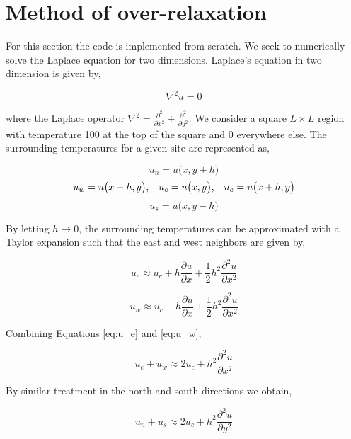 \documentclass{article}
\begin{document}
\section{Method of over-relaxation}

For this section the code is implemented from scratch. We seek to numerically solve the Laplace equation for two dimensions. Laplace's
equation in two dimension is given by,


\begin{equation}
\label{eq:laplace_eq}
  \nabla^{2}u = 0
\end{equation}

where the Laplace operator $\nabla^{2} = \frac{\partial^2}{\partial x^2} + \frac{\partial^2}{\partial y^2}$. We consider a square $L \times L$ region with
temperature 100 at the top of the square and 0 everywhere else. The surrounding temperatures for a given site are represented as,

$$
u_{n} = u\big(x, y + h\big)
$$
$$
u_{w} = u\big(x - h, y\big)\text{,}\quad u_{c} = u\big(x, y\big)\text{,}\quad u_{e} = u\big(x + h, y\big) \\
$$
$$
u_{s} = u\big(x, y - h\big)
$$

By letting $h \rightarrow 0$, the surrounding temperatures can be approximated with a Taylor expansion such that the east and west neighbors are given by,

\begin{equation}
\label{eq:u_e}
  u_{e} \approx u_{c} + h\frac{\partial u}{\partial x} + \frac{1}{2}h^{2}\frac{\partial^2 u}{\partial x^2}
\end{equation}

\begin{equation}
\label{eq:u_w}
  u_{w} \approx u_{c} - h\frac{\partial u}{\partial x} + \frac{1}{2}h^{2}\frac{\partial^2 u}{\partial x^2}
\end{equation}

Combining Equations \ref{eq:u_e} and \ref{eq:u_w},

\begin{equation}
\label{eq:u_ew}
  u_{e} + u_{w} \approx 2u_{c} + h^{2}\frac{\partial^2 u}{\partial x^2}
\end{equation}

By similar treatment in the north and south directions we obtain,

\begin{equation}
\label{eq:u_ns}
  u_{n} + u_{s} \approx 2u_{c} + h^{2}\frac{\partial^2 u}{\partial y^2}
\end{equation}
\end{document}
